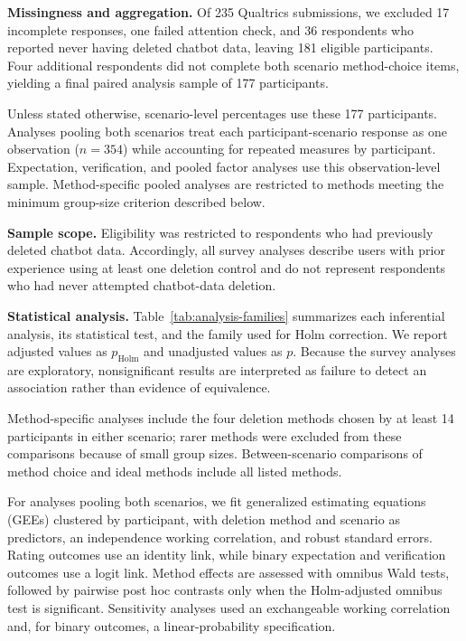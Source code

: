 \documentclass[conference,compsoc]{IEEEtran}
\begin{document}
\textbf{Missingness and aggregation.} Of 235 Qualtrics submissions, we excluded 17 incomplete responses, one failed attention check, and 36 respondents who reported never having deleted chatbot data, leaving 181 eligible participants. Four additional respondents did not complete both scenario method-choice items, yielding a final paired analysis sample of 177 participants.

Unless stated otherwise, scenario-level percentages use these 177 participants. Analyses pooling both scenarios treat each participant-scenario response as one observation ($n=354$) while accounting for repeated measures by participant. Expectation, verification, and pooled factor analyses use this observation-level sample. Method-specific pooled analyses are restricted to methods meeting the minimum group-size criterion described below.

\textbf{Sample scope.} Eligibility was restricted to respondents who had previously deleted chatbot data. Accordingly, all survey analyses describe users with prior experience using at least one deletion control and do not represent respondents who had never attempted chatbot-data deletion.

\textbf{Statistical analysis.} Table~\ref{tab:analysis-families} summarizes each inferential analysis, its statistical test, and the family used for Holm correction. We report adjusted values as $p_{\mathrm{Holm}}$ and unadjusted values as $p$. Because the survey analyses are exploratory, nonsignificant results are interpreted as failure to detect an association rather than evidence of equivalence.

Method-specific analyses include the four deletion methods chosen by at least 14 participants in either scenario; rarer methods were excluded from these comparisons because of small group sizes. Between-scenario comparisons of method choice and ideal methods include all listed methods.

For analyses pooling both scenarios, we fit generalized estimating equations (GEEs) clustered by participant, with deletion method and scenario as predictors, an independence working correlation, and robust standard errors. Rating outcomes use an identity link, while binary expectation and verification outcomes use a logit link. Method effects are assessed with omnibus Wald tests, followed by pairwise post hoc contrasts only when the Holm-adjusted omnibus test is significant. Sensitivity analyses used an exchangeable working correlation and, for binary outcomes, a linear-probability specification.
\end{document}
